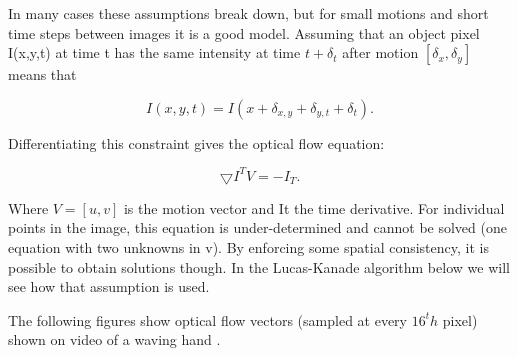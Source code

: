\documentclass[12pt,fleqn]{book} %
\begin{document}
In many cases these assumptions break down, but for small motions and short time steps between images it is a good model. Assuming that an object pixel I(x,y,t) at time t has the same intensity at time $t+\delta_t$ after motion $[\delta_x, \delta_y]$ means that 
\begin{dBox}
\begin{equation}
I(x,y,t) =I(x + \delta_{x,y} + \delta_{y,t} + \delta_t).
\end{equation}
\end{dBox}

Differentiating this constraint gives the optical flow equation:

\begin{dBox}
\begin{equation}
\bigtriangledown I^T V = - I_T.
\end{equation}
\end{dBox}

Where $V = [u, v]$ is the motion vector and It the time derivative. For individual points in the image, this equation is under-determined and cannot be solved (one equation with two unknowns in v). By enforcing some spatial consistency, it is possible to obtain solutions though. In the Lucas-Kanade algorithm below we will see how that assumption is used.\bigskip

The following figures show optical flow vectors (sampled at every $16^th$ pixel) shown on video of a waving hand \cite{dynamic4}. 

\begin{figure}[h]
\begin{dBox}
\centering
  \mbox{
   }
   \caption{\label{fig:dynamic678} }   
\end{dBox}   
\end{figure}
\end{document}
